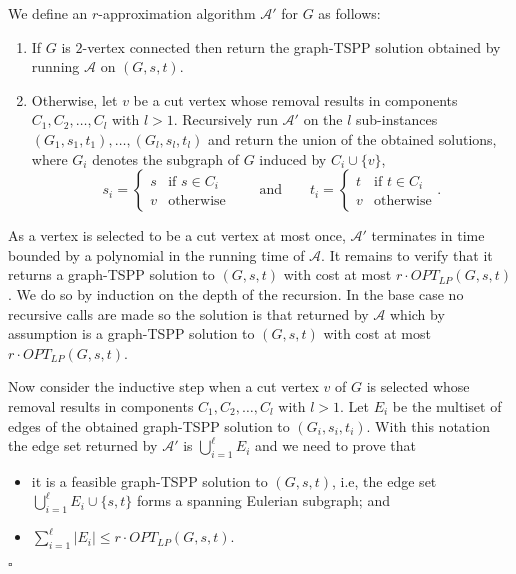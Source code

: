 \documentclass[letterpaper,11pt]{article}
\newenvironment{proof}{\begin{trivlist}
\item[\hskip\labelsep {\bf Proof}.]}{\QED \end{trivlist}}
\newcommand{\QED}{\hfill $\square$}
\newcommand{\OLP}[1]{\ensuremath{OPT_{LP}(#1)}}
\newcommand{\HPP}{graph-TSPP\xspace}
\begin{document}
\begin{proof}
  We define an $r$-approximation algorithm $\mathcal{A'}$ for $G$ as
  follows:
  \begin{enumerate}
  \item If $G$ is $2$-vertex connected then return the \HPP{} solution
    obtained by running $\mathcal{A}$ on $(G,s,t)$.
  \item Otherwise, let $v$ be a cut vertex whose removal results in
    components $C_1, C_2,\ldots,C_l$ with $l >1$. 
    Recursively run
      $\mathcal{A'}$ on the $l$ sub-instances $(G_1,s_1, t_1), \dots, (G_l, s_l, t_l)$ and return the union of the obtained solutions, where $G_i$  denotes the subgraph of $G$ induced by $C_i \cup \{v\}$, 
      $$s_i = \begin{cases} 
        s & \mbox{if }s\in C_i \\ 
        v & \mbox{otherwise}
      \end{cases}\qquad  \mbox{and} \qquad t_i = \begin{cases} 
        t & \mbox{if }t\in C_i \\ 
        v & \mbox{otherwise}
      \end{cases}.$$
      
  \end{enumerate}
  As a vertex is selected to be a cut vertex at most once,
  $\mathcal{A'}$ terminates in time bounded by a polynomial in the
  running time of $\mathcal{A}$.  It remains to verify that it returns
  a \HPP{} solution to $(G,s,t)$ with cost at most $r \cdot
  \OLP{G,s,t}$. We do so by induction on the depth of the
  recursion. In the base case no recursive calls are made so the
  solution is that returned by $\mathcal{A}$ which by assumption is a
  \HPP{} solution to $(G,s,t)$ with cost at most $r \cdot
  \OLP{G,s,t}$.

  Now consider the inductive step when a cut vertex $v$ of $G$ is
  selected whose removal results in components $C_1, C_2, \ldots, C_l$
  with $l > 1$.  Let $E_i$ be the multiset of edges of the obtained
  \HPP{} solution to $(G_i, s_i, t_i)$. With this notation the edge
  set returned by $\mathcal{A}'$ is $\bigcup_{i=1}^\ell E_i$ and we
  need to prove that 
  \begin{itemize}
  \item[(a)] it is a feasible \HPP{} solution to $(G, s,t)$, i.e, the
    edge set $\bigcup_{i=1}^\ell E_i \cup \{s,t\}$ forms a spanning
    Eulerian subgraph; and
  \item [(b)] $\sum_{i=1}^\ell |E_i| \leq r \cdot \OLP{G,s,t}.$
\end{itemize}


\end{proof}
\end{document}
